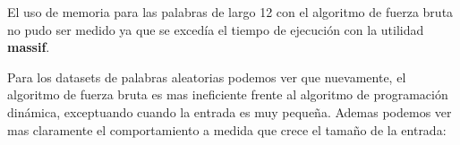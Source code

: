 \begin{enumerate}
    \begin{mdframed}
        El uso de memoria para las palabras de largo 12 con el algoritmo de 
        fuerza bruta no pudo ser medido ya que 
        se excedía el tiempo de ejecución con la utilidad \textbf{massif}.
    \end{mdframed}

    Para los datasets de palabras aleatorias podemos ver que nuevamente,
    el algoritmo de fuerza bruta es mas ineficiente frente al algoritmo
    de programación dinámica, exceptuando cuando la entrada es muy pequeña.
    Ademas podemos ver mas claramente el comportamiento a medida que crece el 
    tamaño de la entrada:


    \begin{figure}[H]
        \centering
      

    \end{figure}

    \begin{figure}[H]
        \centering
      

\end{figure}
\end{enumerate}
